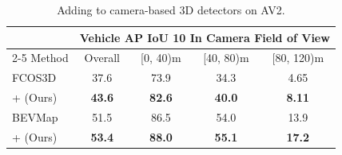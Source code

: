 \begin{table}[]
    \centering
    \footnotesize
    \begin{tabular}{@{}lcccc@{}}
    \toprule
                                    & \multicolumn{4}{c}{Vehicle AP IoU 10 In Camera Field of View} \\ 
                                    \cmidrule(lr){2-5}        
    Method                          & Overall & [0, 40)m        & [40, 80)m       & [80, 120)m \\ \midrule
    FCOS3D~\cite{wang2021fcos3d}    & 37.6             & 73.9            & 34.3            & 4.65          \\
    \rowcolor{tablecolor}
    +\ourmodel{} (Ours)             & \textbf{43.6}    & \textbf{82.6}   & \textbf{40.0}   & \textbf{8.11}  \\  \midrule
    BEVMap~\cite{chang2024bevmap}   & 51.5             & 86.5            & 54.0            & 13.9          \\
    \rowcolor{tablecolor}
    +\ourmodel{} (Ours)             & \textbf{53.4}    & \textbf{88.0}   & \textbf{55.1}   & \textbf{17.2}  \\ 
    \bottomrule
    \end{tabular}
    \caption{Adding \ourmodel{} to camera-based 3D detectors on AV2.}
    \vspace{-5mm}
    \label{tab:av2-cam}
\end{table}